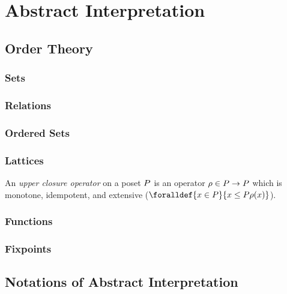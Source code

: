 
\chapter{Abstract Interpretation}

\section{Order Theory}

\subsection{Sets}

\subsection{Relations}

\subsection{Ordered Sets}

\subsection{Lattices}

\begin{definition}
  An \emph{upper closure operator} on a poset $P$ is an operator $\rho\in P\to P$ which is monotone, idempotent, and extensive ($\foralldef{\defposetelem \in \defposet}{\defposetelem \le P \rho(\defposetelem)}$).
\end{definition}

\subsection{Functions}

\subsection{Fixpoints}

\section{Notations of Abstract Interpretation}

